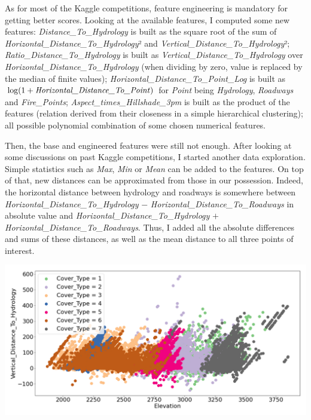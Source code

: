 \documentclass{article}
\newenvironment{Figure}
  {\par\medskip\noindent\minipage{\linewidth}}
  {\endminipage\par\medskip}
\begin{document}
\begin{multicols}{2}
As for most of the Kaggle competitions, feature engineering is mandatory for
getting better scores. Looking at the available features, I computed some new
features: \textit{Distance\_To\_Hydrology} is built as the square root of
the sum of \textit{Horizontal\_Distance\_To\_Hydrology}² and
\textit{Vertical\_Distance\_To\_Hydrology}²; \textit{Ratio\_Distance\_To\_Hydrology}
is built as \textit{Vertical\_Distance\_To\_Hydrology} over
\textit{Horizontal\_Distance\_To\_Hydrology} (when dividing by zero, value is
replaced by the median of finite values);
\textit{Horizontal\_Distance\_To\_Point\_Log} is built as
$\log(1+\text{\textit{Horizontal\_Distance\_To\_Point}})$ for
\textit{Point} being \textit{Hydrology}, \textit{Roadways} and \textit{Fire\_Points};
\textit{Aspect\_times\_Hillshade\_3pm} is built as the product of the features
(relation derived from their closeness in a simple hierarchical clustering);
all possible polynomial combination of some chosen numerical features.

Then, the base and engineered features were still not enough. After looking
at some discussions on past Kaggle competitions, I started another
data exploration. Simple statistics such as \textit{Max}, \textit{Min} or 
\textit{Mean} can be added
to the features. On top of that, new distances can be approximated from those
in our possession. Indeed, the horizontal distance between hydrology and roadways is
somewhere between \textit{Horizontal\_Distance\_To\_Hydrology} $-$
\textit{Horizontal\_Distance\_To\_Roadways} in absolute value and
\textit{Horizontal\_Distance\_To\_Hydrology} $+$
\textit{Horizontal\_Distance\_To\_Roadways}. Thus, I added all the absolute
differences and sums of these distances, as well as the mean distance to
all three points of interest.

\begin{Figure}
  \centering
  \captionsetup{type=figure}
  \includegraphics[width=0.85\linewidth]{figures/elevverthyd.png}
  \label{fig:elevverthyd}
\end{Figure}


\end{multicols}
\end{document}
